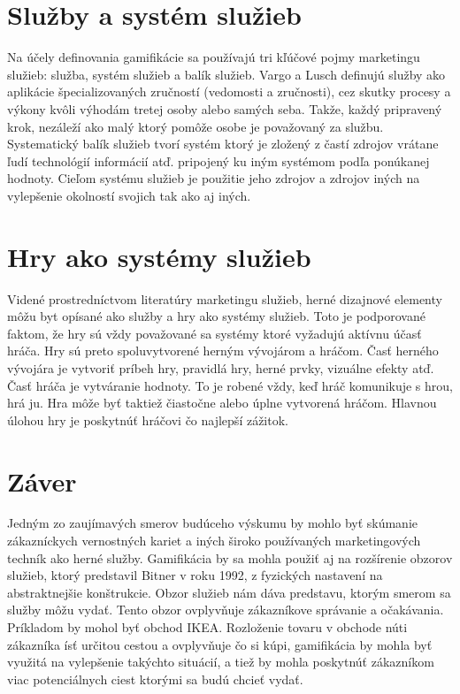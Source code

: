 \documentclass[10pt,oneside,slovak]{article}
\begin{document}
\section{Služby a systém služieb} \label{dolezita}
Na účely definovania gamifikácie sa používajú tri kľúčové pojmy
marketingu služieb: služba, systém služieb a
balík služieb.
Vargo a Lusch definujú služby ako aplikácie špecializovaných zručností (vedomosti a zručnosti), cez skutky procesy a výkony kvôli výhodám tretej osoby alebo samých seba. Takže, každý pripravený krok, nezáleží ako malý ktorý pomôže osobe je považovaný za službu. Systematický balík služieb tvorí systém ktorý je zložený z častí zdrojov vrátane ľudí technológií informácií atď. pripojený ku iným systémom podľa ponúkanej hodnoty. Cieľom systému služieb je použitie jeho zdrojov a zdrojov iných na vylepšenie okolností svojich tak ako aj iných. 




\section{Hry ako systémy služieb} \label{dolezitejsia}
Videné prostredníctvom literatúry marketingu služieb, herné dizajnové elementy môžu byt opísané ako služby a hry ako systémy služieb. Toto je podporované faktom, že hry sú vždy považované sa systémy ktoré vyžadujú aktívnu účasť hráča. Hry sú preto spoluvytvorené herným vývojárom a hráčom. Časť herného vývojára je vytvoriť príbeh hry, pravidlá hry, herné prvky, vizuálne efekty atď. Časť hráča je vytváranie hodnoty. To je robené vždy, keď hráč komunikuje s hrou, hrá ju. Hra môže byť taktiež čiastočne alebo úplne vytvorená hráčom. Hlavnou úlohou hry je poskytnúť hráčovi čo najlepší zážitok.


\section{Záver} \label{zaver} %
Jedným zo zaujímavých smerov budúceho výskumu by mohlo byť skúmanie
zákazníckych vernostných kariet a iných široko používaných marketingových techník
ako herné služby. Gamifikácia by sa mohla použiť aj
na rozšírenie obzorov služieb, ktorý predstavil Bitner v roku 1992,
z fyzických nastavení na abstraktnejšie konštrukcie. Obzor služieb nám dáva predstavu, ktorým smerom sa služby môžu vydať. Tento obzor ovplyvňuje zákazníkove správanie a očakávania. Príkladom by mohol byť obchod IKEA. Rozloženie tovaru v obchode núti zákazníka ísť určitou cestou a ovplyvňuje čo si kúpi, gamifikácia by mohla byť využitá na vylepšenie takýchto situácií, a tiež by mohla poskytnúť zákazníkom viac potenciálnych ciest ktorými sa budú chcieť vydať.




\centering
\end{document}
